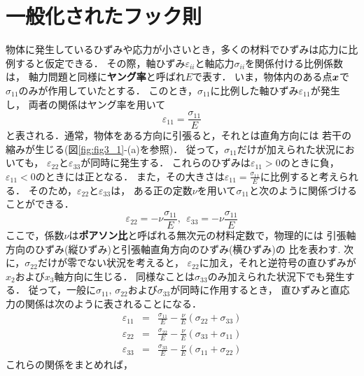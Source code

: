 \documentclass[10pt,a4j]{jbook}
\begin{document}
\section{一般化されたフック則}
物体に発生しているひずみや応力が小さいとき，多くの材料でひずみは応力に比例すると仮定できる．
その際，軸ひずみ$\varepsilon_{ii}$と軸応力$\sigma_{ii}$を関係付ける比例係数は，
軸力問題と同様に{\bf ヤング率}と呼ばれ$E$で表す．
いま，物体内のある点$\mbox{\boldmath $x$}$で$\sigma_{11}$のみが作用していたとする．
このとき，$\sigma_{11}$に比例した軸ひずみ$\varepsilon_{11}$が発生し，
両者の関係はヤング率を用いて
\begin{equation}
	\varepsilon_{11}=\frac{\sigma_{11}}{E}
\end{equation}
と表される．通常，物体をある方向に引張ると，それとは直角方向には
若干の縮みが生じる(図\ref{fig:fig3_1}-(a)を参照)．
従って，$\sigma_{11}$だけが加えられた状況においても，
$\varepsilon_{22}$と$\varepsilon_{33}$が同時に発生する．
これらのひずみは$\varepsilon_{11}>0$のときに負，$\varepsilon_{11}<0$のときには正となる．
また，その大きさは$\varepsilon_{11}=\frac{\sigma_{11}}{E}$に比例すると考えられる．
そのため，$\varepsilon_{22}$と$\varepsilon_{33}$は，
ある正の定数$\nu$を用いて$\sigma_{11}$と次のように関係づけることができる．
\begin{equation}
	\varepsilon_{22}=-\nu \frac{\sigma_{11}}{E}, \ \
	\varepsilon_{33}=-\nu \frac{\sigma_{11}}{E}
\end{equation}
ここで，係数$\nu$は{\bf ポアソン比}と呼ばれる無次元の材料定数で，物理的には
引張軸方向のひずみ(縦ひずみ)と引張軸直角方向のひずみ(横ひずみ)の
比を表わす. 次に，$\sigma_{22}$だけが零でない状況を考えると，
$\varepsilon_{22}$に加え，それと逆符号の直ひずみが$x_2$および$x_3$軸方向に生じる．
同様なことは$\sigma_{33}$のみ加えられた状況下でも発生する．
従って，一般に$\sigma_{11},\,\sigma_{22}$および$\sigma_{33}$が同時に作用するとき，
直ひずみと直応力の関係は次のように表されることになる．
\begin{eqnarray}
	\varepsilon_{11} &=& \frac{\sigma_{11}}{E}-\frac{\nu}{E}\left( \sigma_{22}+\sigma_{33} \right) \\
	\varepsilon_{22} &=& \frac{\sigma_{22}}{E}-\frac{\nu}{E}\left( \sigma_{33}+\sigma_{11} \right) \\
	\varepsilon_{33} &=& \frac{\sigma_{33}}{E}-\frac{\nu}{E}\left( \sigma_{11}+\sigma_{22} \right)
	\label{eqn:eii_sjj}
\end{eqnarray}
これらの関係をまとめれば，
\end{document}
